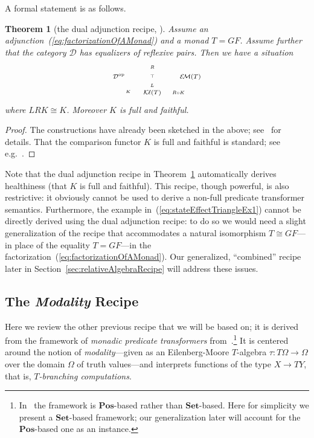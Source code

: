 \documentclass[9pt, preprint]{sigplanconf}
\theoremstyle{theorem}
\newtheorem{theorem}{Theorem}[section]
\theoremstyle{definition}
\newcommand{\cat}[1]{\mathcal{#1}}
\newcommand{\op}{\mathrm{op}}
\newcommand{\Set}{\mathbf{Set}}
\newcommand{\Sets}{\Set}
\newcommand{\Pos}{\mathbf{Pos}}
\newcommand{\EM}{\mathcal{E}{\kern-.5ex}\mathcal{M}}
\newcommand{\Kl}{\mathcal{K}{\kern-.2ex}\ell}
\newcommand{\co}{\mathrel{\circ}}
\begin{document}
 A formal statement is as follows.
\begin{theorem}[the dual adjunction recipe, {\cite[Theorem~1]{Jacobs15CALCO}}]
\label{thm:recipeInJacobs15CALCO}
 Assume an adjunction~(\ref{eq:factorizationOfAMonad}) and a monad
 $T=GF$. Assume further that the category $\cat{D}$ has equalizers of
 reflexive pairs. Then we have a situation
       \begin{align*}\scriptsize
	  \vcenter{\xymatrix@R-2.3em@C-1em{
  {\cat{D}^{\op}}
\ar@/^/@{->}[rr]^-{R}
 \ar@{}[rr]|-{\top}
  &
&
  {\EM(T)}
 \ar@/^/[ll]^-{L}
 \\
 &
 {\Kl(T)}
    \ar@/^/[ul]^-{K}
\ar@/_/[ur]_-{R\co K}
}}
       \end{align*}
where $LRK\cong K$. Moreover $K$ is full and faithful.
\end{theorem}
\begin{proof}
 The constructions have already been sketched in the above;
 see~\cite{Jacobs15CALCO} for details. That the comparison functor $K$
 is full and  faithful is standard; see e.g.~\cite{MacLane71,BarrW85}.
\end{proof}
Note that the dual adjunction
recipe in Theorem~\ref{thm:recipeInJacobs15CALCO}
automatically derives healthiness (that $K$ is full and
faithful). This recipe, though powerful, is also restrictive:
it obviously cannot be used to derive a non-full
predicate transformer semantics. Furthermore, the example
in~(\ref{eq:stateEffectTriangleEx1}) cannot be directly derived using
the dual adjunction recipe:
to do so we would need a slight generalization of the recipe that accommodates
a natural isomorphism $T\cong GF$---in place of the equality $T=GF$---in the
factorization~(\ref{eq:factorizationOfAMonad}). Our
generalized, ``combined'' recipe later in Section~\ref{sec:relativeAlgebraRecipe} will address these
issues.


\subsection{The  \emph{Modality} Recipe
}
\label{sub:set-pt-semantics}
Here we review the other previous recipe that we will be based on; it is
derived from the framework
of \emph{monadic predicate transformers}
from~\cite{Hasuo14,Hasuo15TCS}.\footnote{In~\cite{Hasuo14,Hasuo15TCS}
the framework is $\Pos$-based rather than $\Sets$-based. Here for
simplicity we present a $\Sets$-based framework; our generalization
later will account for the $\Pos$-based one as an instance. }
It is centered around the notion of \emph{modality}---given as an
Eilenberg-Moore
$T$-algebra $\tau\colon T\Omega\to \Omega$ over the domain $\Omega$ of
truth values---and interprets functions of the type $X\to TY$, that is,
\emph{$T$-branching computations}.
\end{document}

